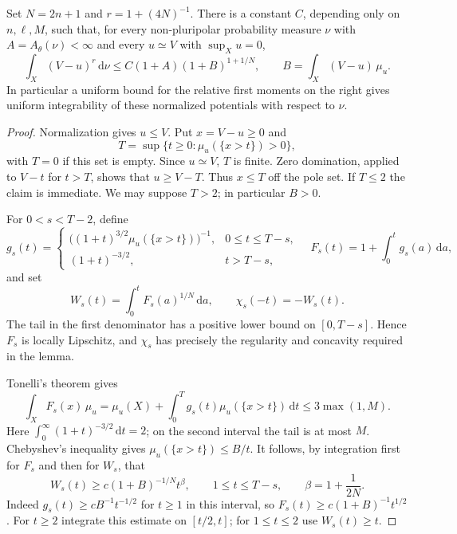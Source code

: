\begin{proposition}\label{prop:big-minimal-higher-moment}
Set $N=2n+1$ and $r=1+(4N)^{-1}$. There is a constant $C$, depending only on $n,\ell,M$, such that, for every non-pluripolar probability measure $\nu$ with $A=A_\theta(\nu)<\infty$ and every $u\simeq V$ with $\sup_Xu=0$,
\[
 \int_X(V-u)^r\,\mathrm{d}\nu
 \leq C(1+A)(1+B)^{1+1/N},
 \qquad B=\int_X(V-u)\,\mu_u.
\]
In particular a uniform bound for the relative first moments on the right gives uniform integrability of these normalized potentials with respect to $\nu$.
\end{proposition}
\begin{proof}
Normalization gives $u\leq V$. Put $x=V-u\geq0$ and
\[
 T=\sup\{t\geq0:\mu_u(\{x>t\})>0\},
\]
with $T=0$ if this set is empty. Since $u\simeq V$, $T$ is finite. Zero domination, applied to $V-t$ for $t>T$, shows that $u\geq V-T$. Thus $x\leq T$ off the pole set. If $T\leq2$ the claim is immediate. We may suppose $T>2$; in particular $B>0$.

For $0<s<T-2$, define
\[
 g_s(t)=
 \begin{cases}
  \bigl((1+t)^{3/2}\mu_u(\{x>t\})\bigr)^{-1},&0\leq t\leq T-s,\\
  (1+t)^{-3/2},&t>T-s,
 \end{cases}
 \quad F_s(t)=1+\int_0^t g_s(a)\,\mathrm{d}a,
\]
and set
\[
 W_s(t)=\int_0^t F_s(a)^{1/N}\,\mathrm{d}a,
 \qquad\chi_s(-t)=-W_s(t).
\]
The tail in the first denominator has a positive lower bound on $[0,T-s]$. Hence $F_s$ is locally Lipschitz, and $\chi_s$ has precisely the regularity and concavity required in the lemma.

Tonelli's theorem gives
\begin{equation}\label{eq:big-weight-derivative-moment}
 \int_X F_s(x)\,\mu_u
 =\mu_u(X)+\int_0^Tg_s(t)\mu_u(\{x>t\})\,\mathrm{d}t
 \leq3\max(1,M).
\end{equation}
Here $\int_0^\infty(1+t)^{-3/2}\,\mathrm{d}t=2$; on the second interval the tail is at most $M$.
Chebyshev's inequality gives $\mu_u(\{x>t\})\leq B/t$. It follows, by integration first for $F_s$ and then for $W_s$, that
\begin{equation}\label{eq:big-weight-growth}
 W_s(t)\geq c(1+B)^{-1/N}t^{\beta},
 \qquad1\leq t\leq T-s,
 \qquad\beta=1+\frac1{2N}.
\end{equation}
Indeed $g_s(t)\geq cB^{-1}t^{-1/2}$ for $t\geq1$ in this interval, so $F_s(t)\geq c(1+B)^{-1}t^{1/2}$. For $t\geq2$ integrate this estimate on $[t/2,t]$; for $1\leq t\leq2$ use $W_s(t)\geq t$.


\end{proof}
